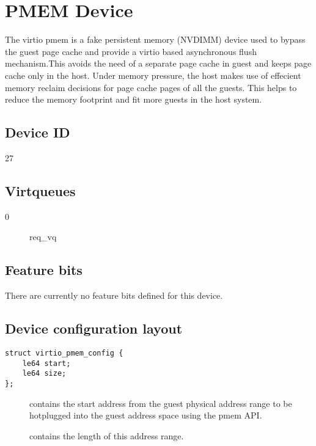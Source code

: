 \section{PMEM Device}\label{sec:Device Types / PMEM Device}

The virtio pmem is a fake persistent memory (NVDIMM) device
used to bypass the guest page cache and provide a virtio
based asynchronous flush mechanism.This avoids the need
of a separate page cache in guest and keeps page cache only
in the host. Under memory pressure, the host makes use of
effecient memory reclaim decisions for page cache pages
of all the guests. This helps to reduce the memory footprint
and fit more guests in the host system.

\subsection{Device ID}\label{sec:Device Types / PMEM Device / Device ID}
  27

\subsection{Virtqueues}\label{sec:Device Types / PMEM Device / Virtqueues}
\begin{description}
\item[0] req_vq
\end{description}

\subsection{Feature bits}\label{sec:Device Types / PMEM Device / Feature bits}

There are currently no feature bits defined for this device.

\subsection{Device configuration layout}\label{sec:Device Types / PMEM Device / Device configuration layout}

\begin{lstlisting}
struct virtio_pmem_config {
	le64 start;
	le64 size;
};
\end{lstlisting}

\begin{description}
\item[] contains the start address from the guest physical address range
to be hotplugged into the guest address space using the pmem API.

\item[] contains the length of this address range.
\end{description}


